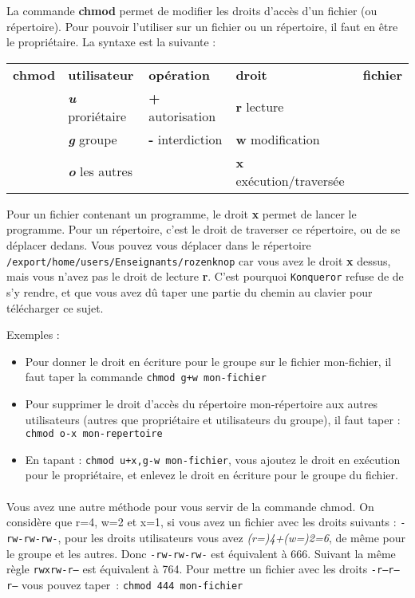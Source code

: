 \documentclass[12pt,a4paper]{article}
\begin{document}
La commande {\bf chmod} permet de modifier
les droits d'accès d'un fichier (ou répertoire). Pour pouvoir
l'utiliser sur un fichier ou un répertoire, il faut en être le
propriétaire.  La syntaxe est la suivante : 


\begin{tabular}[c]{rllll}
{\bf chmod} & {\bf utilisateur} & {\bf opération} & {\bf droit} & {\bf
  fichier}\\
& {\bf \emph{u}} proriétaire & {\bf +} autorisation & {\bf r} lecture
& \\
& {\bf \emph{g}} groupe & {\bf -} interdiction & {\bf w} modification
& \\
& {\bf \emph{o}} les autres &  & {\bf x} exécution/traversée
& \\
\end{tabular}

Pour un fichier contenant un programme, le droit {\bf x} permet
de lancer le programme. Pour un répertoire, c'est le droit de
traverser ce répertoire, ou de se déplacer dedans. Vous pouvez vous
déplacer dans le répertoire {\tt
  /export/home/users/Enseignants/rozenknop} car vous avez le droit
{\bf x} dessus, mais vous n'avez pas le droit de lecture {\bf
  r}. C'est pourquoi {\tt Konqueror} refuse de de s'y rendre, et que
vous avez dû taper une partie du chemin au clavier pour télécharger ce
sujet. 


Exemples :
\begin{itemize}
\item Pour donner le droit en écriture pour le groupe sur le
  fichier mon-fichier, il faut taper la commande \texttt{chmod g+w mon-fichier}
\item Pour supprimer le droit d'accès du répertoire mon-répertoire aux
  autres utilisateurs (autres que propriétaire et utilisateurs du
  groupe), il faut taper : \texttt{chmod o-x mon-repertoire}
\item En tapant : \texttt{chmod u+x,g-w mon-fichier}, vous ajoutez le droit en
  exécution pour le propriétaire, et enlevez le droit en écriture pour
  le groupe du fichier.
\end{itemize}


\paragraph{}Vous avez une autre méthode pour vous servir de la commande chmod. On
considère que r=4, w=2 et x=1, si vous avez un fichier avec les droits
suivants : \texttt{-rw-rw-rw-}, pour les droits utilisateurs vous avez
\textit{(r=)4+(w=)2=6}, de même pour le groupe et les autres. Donc \texttt{-rw-rw-rw-}
est équivalent à 666. Suivant la même règle \texttt{rwxrw-r--} est équivalent à
764. Pour mettre un fichier avec les droits \texttt{-r--r--r--} vous pouvez
taper~: \texttt{chmod 444 mon-fichier}
\end{document}
